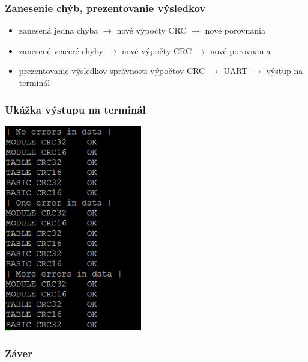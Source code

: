 \documentclass[xcolor=dvipsnames]{beamer}
\begin{document}
\begin{frame}
	\frametitle{Zanesenie chýb, prezentovanie výsledkov}
	\begin{itemize}
		\item zanesená jedna chyba $\rightarrow$ nové výpočty CRC $\rightarrow$ nové porovnania
		\item zanesené viaceré chyby $\rightarrow$ nové výpočty CRC $\rightarrow$ nové porovnania
		\item prezentovanie výsledkov správnosti výpočtov CRC $\rightarrow$ UART $\rightarrow$ výstup na terminál
	\end{itemize}
\end{frame}

\begin{frame}
	\frametitle{Ukážka výstupu na terminál}
	\includegraphics[width=6cm, height=\textheight]{crc.png}
\end{frame}

\begin{frame}
	\frametitle{Záver}
\end{frame}
 
\end{document}

